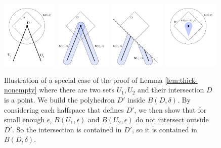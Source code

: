 \documentclass[11pt]{article}
\begin{document}
\begin{figure}
\caption{Illustration of a special case of the proof of Lemma \ref{lem:thick-nonempty} where there are two sets $U_1,U_2$ and their intersection $D$ is a point. We build the polyhedron $D'$ inside $B(D,\delta)$. By considering each halfspace that defines $D'$, we then show that for small enough $\epsilon$, $B(U_1,\epsilon)$ and $B(U_2,\epsilon)$ do not intersect outside $D'$. So the intersection is contained in $D'$, so it is contained in $B(D,\delta)$.}
\includegraphics[width=0.24\textwidth]{figs/separated-proof-2} \hfill
\includegraphics[width=0.24\textwidth]{figs/separated-proof-3} \hfill
\includegraphics[width=0.24\textwidth]{figs/separated-proof-4} \hfill
\includegraphics[width=0.24\textwidth]{figs/separated-proof-5}
\end{figure}
\end{document}
